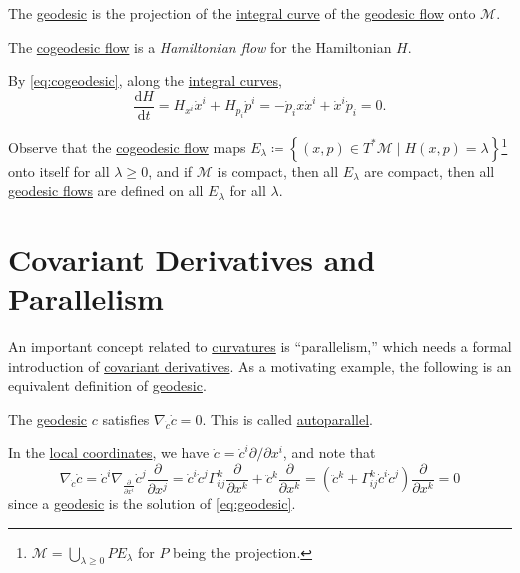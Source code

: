 \begin{intuition}
	The \hyperref[def:geodesic]{geodesic} is the projection of the \hyperref[def:integral-curve]{integral curve} of the \hyperref[def:geodesic-flow]{geodesic flow} onto \(\mathcal{M} \).
\end{intuition}

\begin{note}
	The \hyperref[def:cogeodesic-flow]{cogeodesic flow} is a \emph{Hamiltonian flow} for the Hamiltonian \(H\).
\end{note}
\begin{explanation}
	By \autoref{eq:cogeodesic}, along the \hyperref[def:integral-curve]{integral curves},
	\[
		\frac{\mathrm{d}H}{\mathrm{d}t}
		= H_{x^i} \dot{x}^i + H_{p_i}\dot{p}^i
		= -\dot{p}_i x\dot{x}^i + \dot{x}^i \dot{p}_i = 0.
	\]
\end{explanation}

Observe that the \hyperref[def:cogeodesic-flow]{cogeodesic flow} maps \(E_\lambda \coloneqq \left\{ (x, p)\in T^{\ast} \mathcal{M} \mid H(x, p) = \lambda \right\}\)\footnote{\(\mathcal{M} = \bigcup_{\lambda \geq 0} P E_\lambda \) for \(P\) being the projection.} onto itself for all \(\lambda \geq 0\), and if \(\mathcal{M} \) is compact, then all \(E_\lambda \) are compact, then all \hyperref[def:geodesic-flow]{geodesic flows} are defined on all \(E_\lambda \) for all \(\lambda \).


\section{Covariant Derivatives and Parallelism}
An important concept related to \hyperref[def:Riemannian-curvature]{curvatures} is ``parallelism,'' which needs a formal introduction of \hyperref[def:covariant-derivative]{covariant derivatives}. As a motivating example, the following is an equivalent definition of \hyperref[def:geodesic]{geodesic}.

\begin{eg}[Autoparallel]
	The \hyperref[def:geodesic]{geodesic} \(c\) satisfies \(\nabla _{\dot{c} } \dot{c} = 0\). This is called \hyperref[def:autoparallel]{autoparallel}.
\end{eg}
\begin{explanation}
	In the \hyperref[def:coordinate-chart]{local coordinates}, we have \(\dot{c} = \dot{c}^i \partial / \partial x^i\), and note that
	\begin{equation}\label{eq:autoparallel-geodesic}
		\nabla _{\dot{c}}\dot{c}
		= \dot{c}^i \nabla _{\frac{\partial }{\partial x^i} } \dot{c}^j \frac{\partial }{\partial x^j}
		= \dot{c}^i \dot{c}^j \Gamma _{ij}^k \frac{\partial }{\partial x^k} + \ddot{c}^k \frac{\partial }{\partial x^k}
		= \left( \ddot{c}^k + \Gamma _{ij}^k \dot{c}^i \dot{c}^j \right) \frac{\partial }{\partial x^k}
		= 0
	\end{equation}
	since a \hyperref[def:geodesic]{geodesic} is the solution of \autoref{eq:geodesic}.
\end{explanation}

